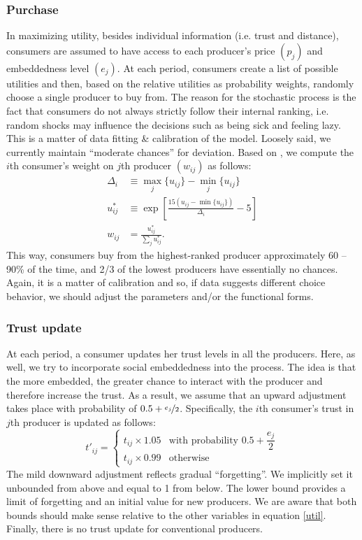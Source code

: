 \documentclass[11pt, oneside]{article}
\begin{document}
\subsubsection{Purchase}
In maximizing utility, besides individual information (i.e. trust and distance), consumers are assumed to have access to each producer's price $(p_j)$ and embeddedness level $(e_j)$. At each period, consumers create a list of possible utilities and then, based on the relative utilities as probability weights, randomly choose a single producer to buy from. The reason for the stochastic process is the fact that consumers do not always strictly follow their internal ranking, i.e. random shocks may influence the decisions such as being sick and feeling lazy. This is a matter of data fitting \& calibration of the model. Loosely said, we currently maintain ``moderate chances'' for deviation. Based on \textcite{Walter2008}, we compute the $i$th consumer's weight on $j$th producer $(w_{ij})$ as follows:
\begin{align*}
  \Delta_i &\equiv \max_j\{u_{ij}\} - \min_j\{u_{ij}\} \\
  u^*_{ij} &\equiv \exp \left[\frac{15(u_{ij} - \min\{u_{ij}\})}{\Delta_i} - 5 \right] \\
  w_{ij} &= \frac{u^*_{ij}}{\sum_j u^*_{ij}} .
\end{align*}
This way, consumers buy from the highest-ranked producer approximately 60 -- 90\% of the time, and 2/3 of the lowest producers have essentially no chances. Again, it is a matter of calibration and so, if data suggests different choice behavior, we should adjust the parameters and/or the functional forms.

\subsubsection{Trust update}
At each period, a consumer updates her trust levels in all the producers. Here, as well, we try to incorporate social embeddedness into the process. The idea is that the more embedded, the greater chance to interact with the producer and therefore increase the trust. As a result, we assume that an upward adjustment takes place with probability of $0.5 + \nicefrac{e_j}{2}$. Specifically, the $i$th consumer's trust in $j$th producer is updated as follows:
\begin{displaymath}
t'_{ij} =
\begin{cases}
t_{ij} \times 1.05 & \text{with probability } 0.5 + \dfrac{e_j}{2}\\
t_{ij} \times 0.99 & \text{otherwise}
\end{cases}
\end{displaymath}
The mild downward adjustment reflects gradual ``forgetting''. We implicitly set it unbounded from above and equal to 1 from below. The lower bound provides a limit of forgetting and an initial value for new producers. We are aware that both bounds should make sense relative to the other variables in equation \ref{util}. Finally, there is no trust update for conventional producers.
\end{document}
